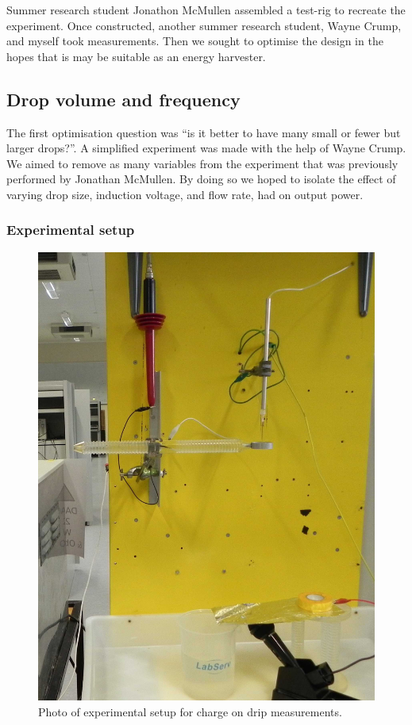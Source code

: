   Summer research student Jonathon McMullen assembled a test-rig to recreate the experiment.
  Once constructed, another summer research student, Wayne Crump, and myself took measurements.
  Then we sought to optimise the design in the hopes that is may be suitable as an energy harvester.


  \subsection*{Drop volume and frequency}
  
    The first optimisation question was ``is it better to have many small or fewer but larger drops?''.
    A simplified experiment was made with the help of Wayne Crump.
    We aimed to remove as many variables from the experiment that was previously performed by Jonathan McMullen.
    By doing so we hoped to isolate the effect of varying drop size, induction voltage, and flow rate, had on output power.
  
  
  \subsubsection*{Experimental setup}
  
  \begin{figure}[ht]
        \centering
        \includegraphics[scale=0.15]{content/appendices/chargedWaterDrops/graphics/Photo_dripperExperiment_Setup_draft.JPG}
        \caption{\label{Photo_dripperExperiment_Setup}Photo of experimental setup for charge on drip measurements.}
    \end{figure}
    
